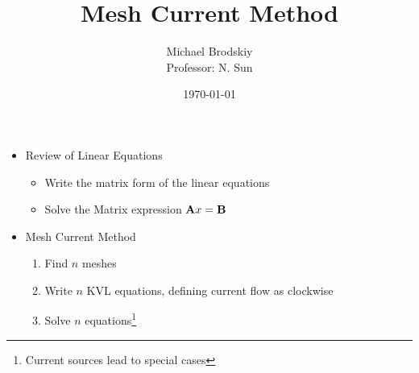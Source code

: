 


\title{Mesh Current Method}
\date{\today}
\author{Michael Brodskiy\\ \small Professor: N. Sun}



\maketitle

\begin{itemize}

  \item Review of Linear Equations

    \begin{itemize}

      \item Write the matrix form of the linear equations

      \item Solve the Matrix expression $\bold{A}x=\bold{B}$

    \end{itemize}

  \item Mesh Current Method

    \begin{enumerate}

      \item Find $n$ meshes

      \item Write $n$ KVL equations, defining current flow as clockwise

      \item Solve $n$ equations\footnote{Current sources lead to special cases}

    \end{enumerate}

\end{itemize}



